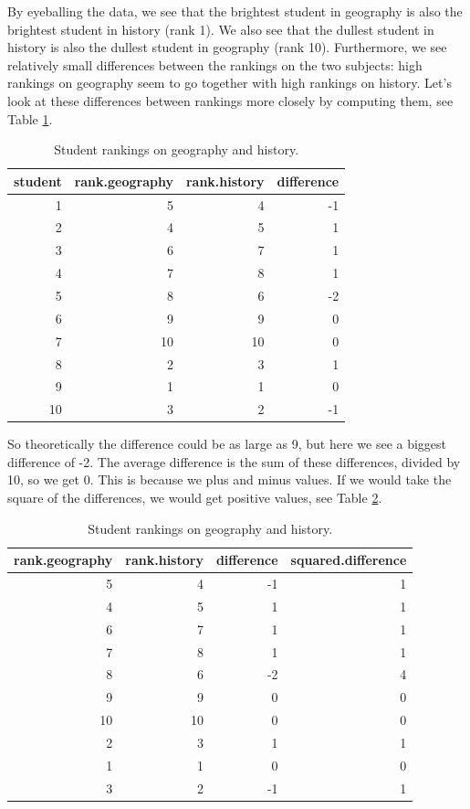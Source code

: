 \documentclass[]{book}\usepackage[]{graphicx}\usepackage[]{color}
\begin{document}
By eyeballing the data, we see that the brightest student in geography is also the brightest student in history (rank 1). We also see that the dullest student in history is also the dullest student in geography (rank 10). Furthermore, we see relatively small differences between the rankings on the two subjects: high rankings on geography seem to go together with high rankings on history. Let's look at these differences between rankings more closely by computing them, see Table \ref{tab:nonpar_4}.

\begin{table}[ht]
\centering
\caption{Student rankings on geography and history.} 
\label{tab:nonpar_4}
\begin{tabular}{rrrr}
  \hline
student & rank.geography & rank.history & difference \\ 
  \hline
1 & 5 & 4 & -1 \\ 
  2 & 4 & 5 & 1 \\ 
  3 & 6 & 7 & 1 \\ 
  4 & 7 & 8 & 1 \\ 
  5 & 8 & 6 & -2 \\ 
  6 & 9 & 9 & 0 \\ 
  7 & 10 & 10 & 0 \\ 
  8 & 2 & 3 & 1 \\ 
  9 & 1 & 1 & 0 \\ 
  10 & 3 & 2 & -1 \\ 
   \hline
\end{tabular}
\end{table}


So theoretically the difference could be as large as 9, but here we see a biggest difference of -2. The average difference is the sum of these differences, divided by 10, so we get 0. This is because we plus and minus values. If we would take the square of the differences, we would get positive values, see Table \ref{tab:nonpar_5}.

\begin{table}[ht]
\centering
\caption{Student rankings on geography and history.} 
\label{tab:nonpar_5}
\begin{tabular}{rrrr}
  \hline
rank.geography & rank.history & difference & squared.difference \\ 
  \hline
5 & 4 & -1 & 1 \\ 
  4 & 5 & 1 & 1 \\ 
  6 & 7 & 1 & 1 \\ 
  7 & 8 & 1 & 1 \\ 
  8 & 6 & -2 & 4 \\ 
  9 & 9 & 0 & 0 \\ 
  10 & 10 & 0 & 0 \\ 
  2 & 3 & 1 & 1 \\ 
  1 & 1 & 0 & 0 \\ 
  3 & 2 & -1 & 1 \\ 
   \hline
\end{tabular}
\end{table}
\end{document}
